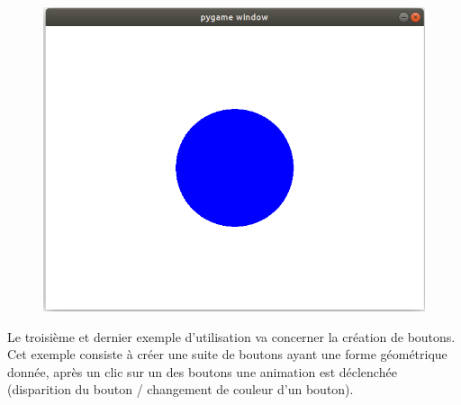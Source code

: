 \documentclass[a4paper]{article}
\begin{document}
\begin{figure}[h!]
   \begin{minipage}[b]{0.10\linewidth}
      \centering 
 
   \end{minipage}\hfill
   \begin{minipage}[b]{0.10\linewidth}   
      \centering 
      \includegraphics[scale=0.2]{img2.png}
      
  
   \end{minipage}

   \end{figure}


\newpage

Le troisième et dernier exemple d'utilisation va concerner la création de boutons.
Cet exemple consiste à créer une suite de boutons ayant une forme géométrique donnée, après un clic sur un des boutons une
animation est déclenchée (disparition du bouton / changement de couleur d'un bouton).
\end{document}
